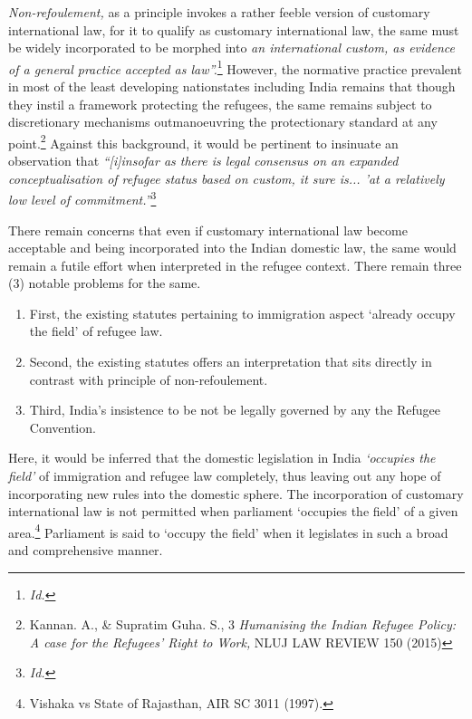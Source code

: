 \begin{multicols}{2}

\noi
\textit{Non-refoulement,} as a principle invokes a rather feeble version of customary international
law, for it to qualify as customary international law, the same must be widely incorporated to
be morphed into \textit{an international custom, as evidence of a general practice accepted as
law”.}\footnote{\textit{Id.}} However, the normative practice prevalent in most of the least developing nationstates including India remains that though they instil a framework protecting the refugees, the
same remains subject to discretionary mechanisms outmanoeuvring the protectionary
standard at any point.\footnote{Kannan. A., \& Supratim Guha. S., 3 \textit{Humanising the Indian Refugee Policy: A case for the Refugees’ Right to Work,} NLUJ LAW REVIEW 150 (2015)} Against this background, it would be pertinent to insinuate an observation that \textit{“[i]insofar as there is legal consensus on an expanded conceptualisation of
refugee status based on custom, it sure is... 'at a relatively low level of commitment.”}\footnote{\textit{Id.}}


\noi
There remain concerns that even if customary international law become acceptable and being
incorporated into the Indian domestic law, the same would remain a futile effort when
interpreted in the refugee context. There remain three (3) notable problems for the same.

\begin{enumerate}[label=$\bullet$]
\item First, the existing statutes pertaining to immigration aspect `already occupy the field'
of refugee law.

\item Second, the existing statutes offers an interpretation that sits directly in contrast with
principle of non-refoulement.

\item Third, India’s insistence to be not be legally governed by any the Refugee
Convention.
\end{enumerate}


\noi
Here, it would be inferred that the domestic legislation in India \textit{‘occupies the field’} of
immigration and refugee law completely, thus leaving out any hope of incorporating new
rules into the domestic sphere. The incorporation of customary international law is not
permitted when parliament ‘occupies the field’ of a given area.\footnote{Vishaka vs State of Rajasthan, AIR SC 3011 (1997).} Parliament is said to ‘occupy the field’ when it legislates in such a broad and comprehensive manner.


\end{multicols}
